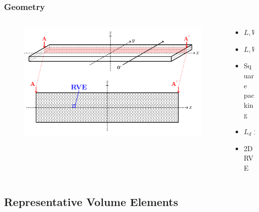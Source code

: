\documentclass[first,firstsupp,lastsupp,last,hyperref,table]{ETHclass}
\begin{document}
\begin{frame}
\frametitle{\small Geometry}
\vspace{-1cm}
\centering
\begin{columns}[c]
\begin{column}{0.85\textwidth}
\begin{figure}
\centering
\includegraphics[width=\columnwidth]{laminate-section.pdf}
\end{figure}
\end{column}
\begin{column}{0.15\textwidth}
\scriptsize
\begin{itemize}[label=]
\item $L, W >> t$
\item $L, W \rightarrow \infty$
\item Square packing
\item$L_{d} >> \Delta\theta_{d}$
\item 2D RVE
\end{itemize}
\end{column}
\end{columns}
\end{frame}

\subsection{Representative Volume Elements}
\end{document}
